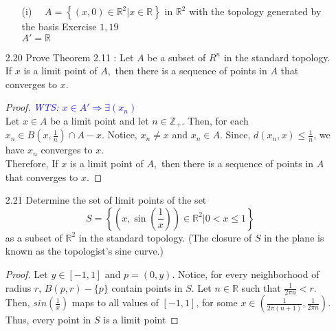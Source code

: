 \documentclass[12pt]{article}
\newcommand{\R}{\mathbb{R}}
\newcommand{\Z}{\mathbb{Z}}
\newcommand{\wts}[1]{\textit{\textcolor{blue}{WTS: #1}}\\}
\begin{document}
\begin{enumerate}
\begin{enumerate}
			\item[(i)] $\quad A=\left\{(x, 0) \in \mathbb{R}^{2} | x \in \mathbb{R}\right\}$ in $\mathbb{R}^{2}$ with the topology generated by the basis Exercise $1,19$\\
			$ A' = \R $
		\end{enumerate}
		\item[2.20] Prove Theorem 2.11 : Let $A$ be a subset of $R^{n}$ in the standard topology. If $x$ is a limit point of $A,$ then there is a sequence of points in $A$ that converges to $x$.
		\begin{proof}
			\wts{$ x \in A' \Rightarrow \exists (x_n)$}
			Let $ x\in A $ be a limit point and let $ n\in \Z_+ $. Then, for each $ x_n \in B(x,\frac{1}{n})\cap A -{x} $. Notice, $ x_n \not = x $ and $ x_n \in A $. Since, $ d(x_n,x)\leq \frac{1}{n} $, we have $ x_n $ converges to $ x $.\\
			Therefore,  If $x$ is a limit point of $A,$ then there is a sequence of points in $A$ that converges to $x$.
		\end{proof}
		\item[2.21] Determine the set of limit points of the set
		$$
		S=\left\{\left(x, \sin \left(\frac{1}{x}\right)\right) \in \mathbb{R}^{2} | 0<x \leq 1\right\}
		$$
		as a subset of $\mathbb{R}^{2}$ in the standard topology. (The closure of $S$ in the plane is known as the topologist's sine curve.)\\
		\begin{proof}
				Let $ y\in[-1,1] $ and $ p  = (0,y)$. Notice, for every neighborhood of radius $ r $, $ B(p,r) - \{p\}$ contain points in $ S $. Let $ n\in \R $ such that $ \frac{1}{2\pi n} < r $. 
				Then, $ sin(\frac{1}{x})  $ maps to all values of $ [-1,1] $, for some $ x\in (\frac{1}{2\pi(n+1)},\frac{1}{2\pi n}) $.\\ Thus, every point in $ S $ is a limit point
		\end{proof}
		
	\end{enumerate}
\end{document}
